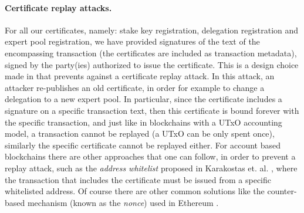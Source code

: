 \paragraph{Certificate replay attacks.}
For all our certificates, namely: stake key registration, delegation
registration and expert pool registration, we have provided signatures of the
text of the encompassing transaction (the certificates are included as
transaction metadata), signed by the party(ies) authorized to issue the
certificate. This is a design choice made in \cite{deldesign} that prevents
against a certificate replay attack. In this attack, an attacker re-publishes an
old certificate, in order for example to change a delegation to a new expert
pool. In particular, since the certificate includes a signature on a specific
transaction text, then this certificate is bound forever with the specific
transaction, and just like in blockchains with a UTxO accounting model, a
transaction cannot be replayed (a UTxO can be only spent once), similarly the
specific certificate cannot be replayed either. For account based blockchains
there are other approaches that one can follow, in order to prevent a replay
attack, such as the \emph{address whitelist} proposed in Karakostas et. al.
\cite{stakepools}, where the transaction that includes the certificate must be
issued from a specific whitelisted address. Of course there are other common
solutions like the counter-based mechanism (known as the \emph{nonce}) used in
Ethereum \cite{ethereum}.


